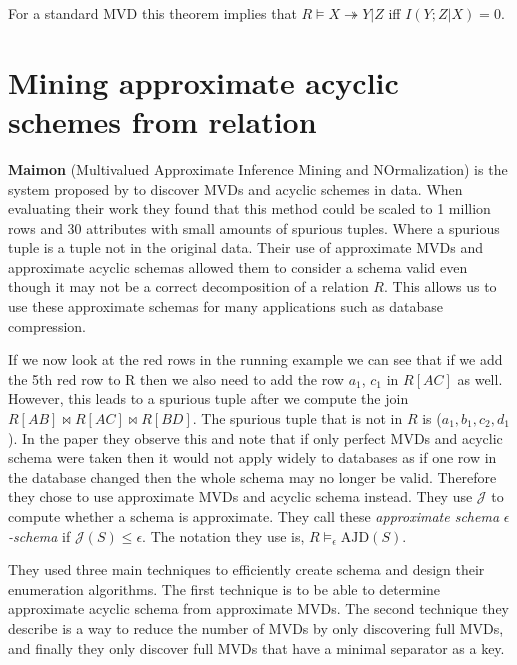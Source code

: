 \documentclass[logo,bsc,singlespacing,parskip,online]{infthesis}
\begin{document}
For a standard MVD this theorem implies that $R \models X \twoheadrightarrow Y|Z$ iff $I(Y;Z|X) = 0$.

\section{Mining approximate acyclic schemes from relation}
\label{MAIMON}
\textbf{Maimon} \citep{DBLP:conf/sigmod/KenigMPSS20}(Multivalued Approximate Inference Mining and NOrmalization) is the system proposed by \citet{DBLP:conf/sigmod/KenigMPSS20} to discover MVDs and acyclic schemes in data. When evaluating their work they found that this method could be scaled to 1 million rows and 30 attributes with small amounts of spurious tuples. Where a spurious tuple is a tuple not in the original data. Their use of approximate MVDs and approximate acyclic schemas allowed them to consider a schema valid even though it may not be a correct decomposition of a relation $R$. This allows us to use these approximate schemas for many applications such as database compression.

If we now look at the red rows in the running example we can see that if we add the 5th red row to R then we also need to add the row $a_1$, $c_1$ in $R[AC]$ as well. However, this leads to a spurious tuple after we compute the join $R[AB] \bowtie R[AC] \bowtie R[BD]$. The spurious tuple that is not in $R$ is ($a_1,b_1,c_2,d_1$). In the paper they observe this and note that if only perfect MVDs and acyclic schema were taken then it would not apply widely to databases as if one row in the database changed then the whole schema may no longer be valid. Therefore they chose to use approximate MVDs and acyclic schema instead. They use $\mathcal{J}$ to compute whether a schema is approximate. They call these \emph{approximate schema} $\epsilon$ \emph{-schema} if $\mathcal{J}(S) \leq \epsilon$. The notation they use is, $R \models_\epsilon \mathrm{AJD}(S)$.

They used three main techniques to efficiently create schema and design their enumeration algorithms. The first technique is to be able to determine approximate acyclic schema from approximate MVDs. The second technique they describe is a way to reduce the number of MVDs by only discovering full MVDs, and finally they only discover full MVDs that have a minimal separator as a key. 
\end{document}
